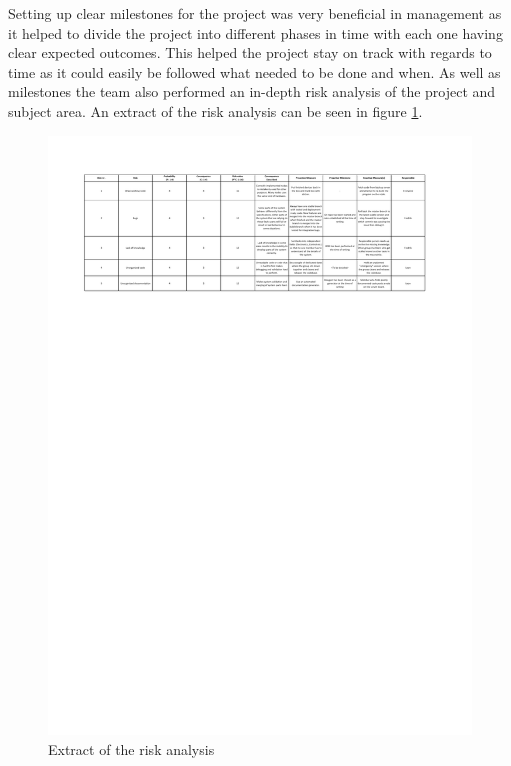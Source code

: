 \documentclass[11pt, titlepage]{article} %
\begin{document}
Setting up clear milestones for the project was very beneficial in management as it helped to divide the project into different phases in time with each one having clear expected outcomes. This helped the project stay on track with regards to time as it could easily be followed what needed to be done and when. As well as milestones the team also performed an in-depth risk analysis of the project and subject area. An extract of the risk analysis can be seen in figure \ref{fig:risks}.

\begin{figure}[]
	\centering
   	\includegraphics[]{risks.pdf}
   	\caption{Extract of the risk analysis}
    \label{fig:risks}
\end{figure}
\end{document}
